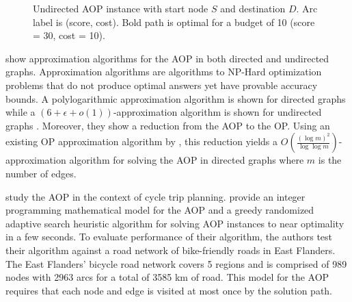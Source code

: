 \documentclass[honors]{union-cs-thesis}
\begin{document}
\begin{figure}
\begin{center}
\end{center}
\caption[Undirected AOP instance]{Undirected AOP instance with start node $S$ and destination $D$. Arc label is (score, cost). Bold path is optimal for a budget of 10 (score = 30, cost = 10).\label{fig:aop-example}}
\end{figure}

 
\citeauthor{gavalas2015approximation} \cite{gavalas2015approximation} show approximation algorithms for the AOP in both directed and undirected graphs. Approximation algorithms are algorithms to NP-Hard optimization problems that do not produce optimal answers yet have provable accuracy bounds. A polylogarithmic approximation algorithm is shown for directed graphs while a $(6 + \epsilon + o(1))$-approximation algorithm is shown for undirected graphs \cite{gavalas2015approximation}. Moreover, they show a reduction from the AOP to the OP. Using an existing OP approximation algorithm by \citeauthor{nagarajan2011directed} \cite{nagarajan2011directed}, this reduction yields a $O(\frac{(\log m)^2}{\log \log m})$-approximation algorithm for solving the AOP in directed graphs where $m$ is the number of edges.

\citeauthor{souffriau2011planning} \cite{souffriau2011planning} study the AOP in the context of cycle trip planning. \citeauthor{souffriau2011planning} provide an integer programming mathematical model for the AOP and a greedy randomized adaptive search heuristic algorithm for solving AOP instances to near optimality in a few seconds. To evaluate performance of their algorithm, the authors test their algorithm against a road network of bike-friendly roads in East Flanders. The East Flanders' bicycle road network covers 5 regions and is comprised of 989 nodes with 2963 arcs for a total of 3585 km of road. This model for the AOP requires that each node and edge is visited at most once by the solution path.
\end{document}
